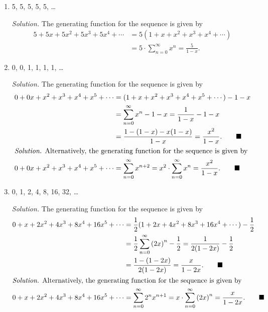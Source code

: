 \documentclass{article}
\begin{document}
\begin{enumerate} 
    \item 5, 5, 5, 5, 5, \ldots\par 
    \textit{Solution.} The generating function for the sequence is given by\begin{align*} 
        5 + 5x + 5x^2 + 5x^3 + 5 x^4 + \cdots &= 5 (1 + x + x^2 + x^3 + x^4 + \cdots)  \\             
        &= 5 \cdot \sum_{n=0}^{\infty} x^n = \frac{5}{1-x}. \tag*{$\blacksquare$} 
    \end{align*} 
    \item 0, 0, 1, 1, 1, 1, \ldots\par 
    \textit{Solution.} The generating function for the sequence is given by\begin{align*} 
        0 + 0x + x^2 + x^3 + x^4 + x^5 + \cdots &= (1 + x + x^2 + x^3 + x^4 + x^5 + \cdots) - 1 - x \\ 
        &= \sum_{n=0}^{\infty} x^{n} - 1 - x = \frac{1}{1-x} - 1 - x \\ 
        &= \frac{1-(1-x)-x(1-x)}{1-x} = \frac{x^2}{1-x}.\tag*{$\blacksquare$} \\
        \intertext{\textit{Solution.} Alternatively, the generating function for the sequence is given by} 
        0 + 0x + x^2 + x^3 + x^4 + x^5 + \cdots &= \sum_{n=0}^{\infty} x^{n+2} = x^2 \cdot \sum_{n=0}^{\infty} x^n = \frac{x^2}{1-x}. \tag*{$\blacksquare$}
    \end{align*} 
    \item 0, 1, 2, 4, 8, 16, 32, \ldots\par
    \textit{Solution.} The generating function for the sequence is given by\begin{align*} 
        0 + x + 2x^2 + 4x^3 + 8x^4 + 16x^5 + \cdots &= \frac{1}{2}(1 + 2x + 4x^2 + 8x^3 + 16x^4 + \cdots) - \frac{1}{2} \\ 
        &= \frac{1}{2} \sum_{n=0}^{\infty} {(2x)}^n - \frac{1}{2} = \frac{1}{2(1-2x)} - \frac{1}{2} \\ 
        &= \frac{1-(1-2x)}{2(1-2x)} = \frac{x}{1-2x}. \tag*{$\blacksquare$} \\ 
        \intertext{\textit{Solution.} Alternatively, the generating function for the sequence is given by}
        0 + x + 2x^2 + 4x^3 + 8x^4 + 16x^5 + \cdots &= \sum_{n=0}^{\infty} 2^n x^{n+1} = x \cdot \sum_{n=0}^{\infty} {(2x)}^n = \frac{x}{1-2x}. \tag*{$\blacksquare$}
    \end{align*} 
    \begin{minipage}[t]{.14\textwidth}

\end{minipage}
\end{enumerate}
\end{document}
